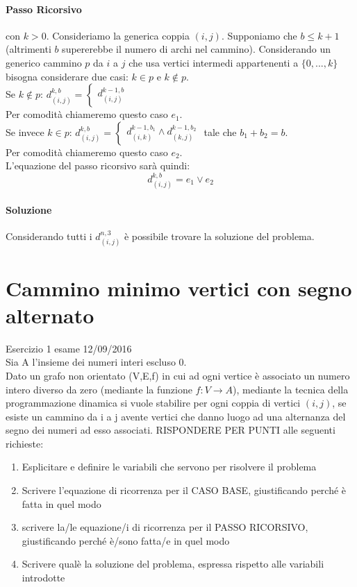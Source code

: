\documentclass[12pt, a4paper, openany]{book}
\begin{document}
\paragraph*{Passo Ricorsivo} con $k>0$.
Consideriamo la generica coppia $(i,j)$. Supponiamo che $b\leq k+1$ (altrimenti $b$ supererebbe il numero di archi nel cammino).
Considerando un generico cammino $p$ da $i$ a $j$ che usa vertici intermedi appartenenti a $\{0,...,k\}$ bisogna considerare due casi: $k\in p$ e $k \notin p$.
\\Se $k \notin p$: $d_{(i,j)}^{k,b} = \begin{cases}d_{(i,j)}^{k-1,b} \end{cases}$
\\Per comodità chiameremo questo caso $e_1$.
\\Se invece $k\in p$: $d_{(i,j)}^{k,b} = \begin{cases} d_{(i,k)}^{k-1,b_1} \wedge d_{(k,j)}^{k-1,b_2}\end{cases}$ tale che $b_1 + b_2 = b$.
\\Per comodità chiameremo questo caso $e_2$.
\\L'equazione del passo ricorsivo sarà quindi: $$d_{(i,j)}^{k,b} = e_1 \vee e_2$$

\paragraph*{Soluzione}
Considerando tutti i $d_{(i,j)}^{n,3}$ è possibile trovare la soluzione del problema.

\section{Cammino minimo vertici con segno alternato} Esercizio 1 esame 12/09/2016\\
Sia A l'insieme dei numeri interi escluso 0.\\
Dato un grafo non orientato (V,E,f) in cui ad ogni vertice è associato un numero intero
diverso da zero (mediante la funzione $f: V\rightarrow A$), mediante la tecnica della
programmazione dinamica si vuole stabilire per ogni coppia di vertici $(i,j)$, se esiste un
cammino da i a j avente vertici che danno luogo ad una alternanza del segno dei numeri
ad esso associati. RISPONDERE PER PUNTI alle seguenti richieste:
\begin{enumerate}
	\item Esplicitare e definire le variabili che servono per risolvere il problema
	\item Scrivere l'equazione di ricorrenza per il CASO BASE, giustificando perché è fatta in quel modo
	\item scrivere la/le equazione/i di ricorrenza per il PASSO RICORSIVO, giustificando perché è/sono fatta/e in quel modo
	\item Scrivere qualè la soluzione del problema, espressa rispetto alle variabili introdotte
\end{enumerate}
\end{document}
